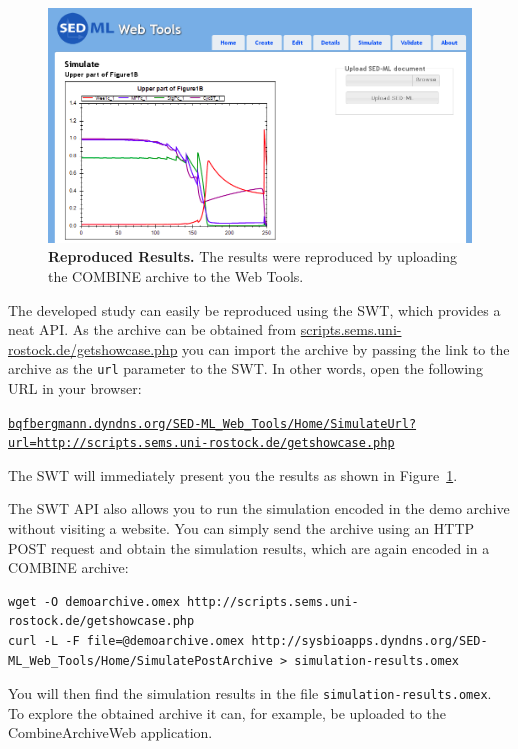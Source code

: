 \begin{figure}
\begin{center}
\includegraphics[width=.78\textwidth]{img/swt-reproduced-cropped.png}
\end{center}
\caption{\textbf{Reproduced Results.} The results were reproduced by uploading the COMBINE archive to the \sedml Web Tools.}
\label{fig:swt-repro}
\end{figure}

The developed study can easily be reproduced using the SWT, which provides a neat API.
As the archive can be obtained from \href{http://scripts.sems.uni-rostock.de/getshowcase.php}{scripts.sems.uni-rostock.de/getshowcase.php} you can import the archive by passing the link to the archive as the \texttt{url} parameter to the SWT.
In other words, open the following URL in your browser:

{\href{http://bqfbergmann.dyndns.org/SED-ML_Web_Tools/Home/SimulateUrl?url=http://scripts.sems.uni-rostock.de/getshowcase.php}{\texttt{{\tiny{bqfbergmann.dyndns.org/SED-ML\_Web\_Tools/Home/}}{\scriptsize{SimulateUrl?url=http://scripts.sems.uni-rostock.de/getshowcase.php}}}}}

The SWT will immediately present you the results as shown in Figure~\ref{fig:swt-repro}.

The SWT API also allows you to run the simulation encoded in the demo archive without visiting a website.
You can simply send the archive using an HTTP POST request and obtain the simulation results, which are again encoded in a COMBINE archive:

\begin{mdframed}[style=mddefault,frametitle={Obtain the simulation results using the API of the \sedml Web Tolls}]
\begin{verbatim}
wget -O demoarchive.omex http://scripts.sems.uni-rostock.de/getshowcase.php
curl -L -F file=@demoarchive.omex http://sysbioapps.dyndns.org/SED-ML_Web_Tools/Home/SimulatePostArchive > simulation-results.omex
\end{verbatim}
\end{mdframed}

You will then find the simulation results in the file \texttt{simulation-results.omex}.
To explore the obtained archive it can, for example, be uploaded to the CombineArchiveWeb application.

